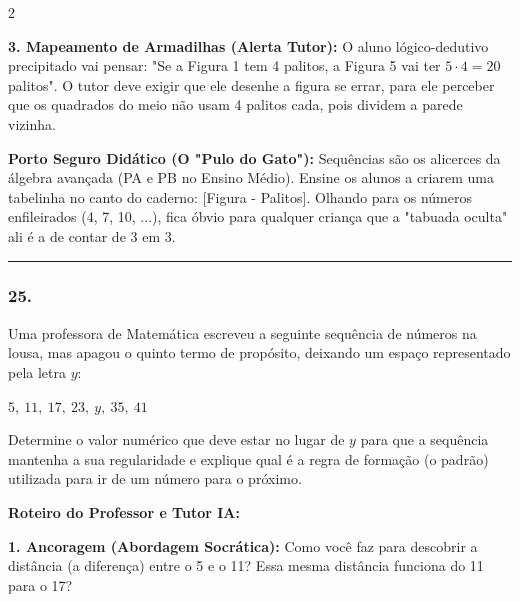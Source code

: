 \begin{multicols*}{2}
\begin{tcolorbox}[colback=CorTitUm!5, colframe=CorTitUm, boxrule=1pt, arc=4pt, left=6pt, right=6pt, top=6pt, bottom=6pt]
    \textbf{3. Mapeamento de Armadilhas (Alerta Tutor):} O aluno lógico-dedutivo precipitado vai pensar: "Se a Figura 1 tem 4 palitos, a Figura 5 vai ter $5 \cdot 4 = 20$ palitos". O tutor deve exigir que ele desenhe a figura se errar, para ele perceber que os quadrados do meio não usam 4 palitos cada, pois dividem a parede vizinha.
    \end{tcolorbox}
    \vspace{0.15cm}
    
    \begin{boxexplicacao}
    \textbf{Porto Seguro Didático (O "Pulo do Gato"):} Sequências são os alicerces da álgebra avançada (PA e PB no Ensino Médio). Ensine os alunos a criarem uma tabelinha no canto do caderno: [Figura - Palitos]. Olhando para os números enfileirados (4, 7, 10, ...), fica óbvio para qualquer criança que a "tabuada oculta" ali é a de contar de 3 em 3.
    \end{boxexplicacao}
\fi

\par\vspace{\espacoQuestao}
\noindent\textcolor{CorLinha}{\rule{\linewidth}{0.5pt}} 
\par\vspace{\espacoPreQuestao}
\subsubsection*{25.} 
\begin{enunciadoLiteral}
Uma professora de Matemática escreveu a seguinte sequência de números na lousa, mas apagou o quinto termo de propósito, deixando um espaço representado pela letra $y$:

$ 5, \ 11, \ 17, \ 23, \ y, \ 35, \ 41 $

Determine o valor numérico que deve estar no lugar de $y$ para que a sequência mantenha a sua regularidade e explique qual é a regra de formação (o padrão) utilizada para ir de um número para o próximo.
\end{enunciadoLiteral}

\ifgabarito
    \begin{tcolorbox}[colback=CorTitUm!5, colframe=CorTitUm, boxrule=1pt, arc=4pt, left=6pt, right=6pt, top=6pt, bottom=6pt]
    \small\textbf{\textcolor{CorTitUm}{Roteiro do Professor e Tutor IA:}}\par\vspace{0.1cm}
    \color{CinzaEscuro}
    \textbf{1. Ancoragem (Abordagem Socrática):} Como você faz para descobrir a distância (a diferença) entre o 5 e o 11? Essa mesma distância funciona do 11 para o 17?\par\vspace{0.1cm}
    

\end{tcolorbox}
\end{multicols*}
